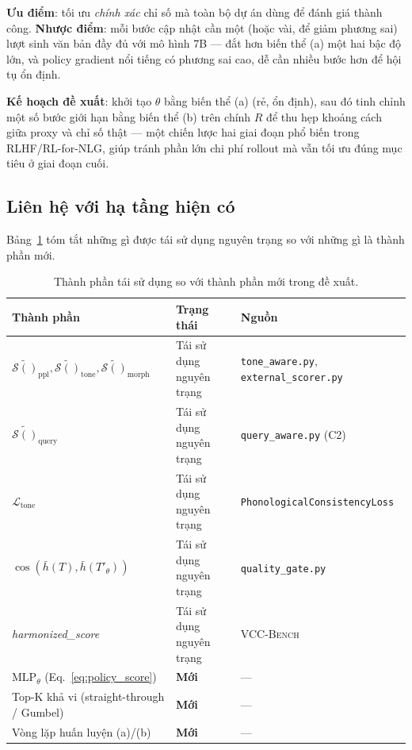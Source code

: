\documentclass[12pt,a4paper]{article}
\newcommand{\score}[1]{\mathcal{S}(#1)}      %
\newcommand{\method}[1]{\textsc{#1}}         %
\begin{document}
\textbf{Ưu điểm}: tối ưu \emph{chính xác} chỉ số mà toàn bộ dự án dùng để đánh giá thành công. \textbf{Nhược điểm}: mỗi bước cập nhật cần một (hoặc vài, để giảm phương sai) lượt sinh văn bản đầy đủ với mô hình 7B --- đắt hơn biến thể (a) một hai bậc độ lớn, và policy gradient nổi tiếng có phương sai cao, dễ cần nhiều bước hơn để hội tụ ổn định.

\textbf{Kế hoạch đề xuất}: khởi tạo $\theta$ bằng biến thể (a) (rẻ, ổn định), sau đó tinh chỉnh một số bước giới hạn bằng biến thể (b) trên chính $R$ để thu hẹp khoảng cách giữa proxy và chỉ số thật --- một chiến lược hai giai đoạn phổ biến trong RLHF/RL-for-NLG, giúp tránh phần lớn chi phí rollout mà vẫn tối ưu đúng mục tiêu ở giai đoạn cuối.

\subsection{Liên hệ với hạ tầng hiện có}

Bảng~\ref{tab:reuse} tóm tắt những gì được tái sử dụng nguyên trạng so với những gì là thành phần mới.

\begin{table}[H]
\centering
\caption{Thành phần tái sử dụng so với thành phần mới trong đề xuất.}
\label{tab:reuse}
\begin{tabular}{lll}
\toprule
\textbf{Thành phần} & \textbf{Trạng thái} & \textbf{Nguồn} \\
\midrule
$\tilde{\score{}}_{\text{ppl}}, \tilde{\score{}}_{\text{tone}}, \tilde{\score{}}_{\text{morph}}$ & Tái sử dụng nguyên trạng & \texttt{tone\_aware.py}, \texttt{external\_scorer.py} \\
$\tilde{\score{}}_{\text{query}}$ & Tái sử dụng nguyên trạng & \texttt{query\_aware.py} (C2) \\
$\mathcal{L}_{\text{tone}}$ & Tái sử dụng nguyên trạng & \texttt{PhonologicalConsistencyLoss} \\
$\cos(\bar h(T), \bar h(T'_\theta))$ & Tái sử dụng nguyên trạng & \texttt{quality\_gate.py} \\
\textit{harmonized\_score} & Tái sử dụng nguyên trạng & \method{VCC-Bench} \\
$\text{MLP}_\theta$ (Eq.~\ref{eq:policy_score}) & \textbf{Mới} & --- \\
Top-K khả vi (straight-through / Gumbel) & \textbf{Mới} & --- \\
Vòng lặp huấn luyện (a)/(b) & \textbf{Mới} & --- \\
\bottomrule
\end{tabular}
\end{table}
\end{document}
